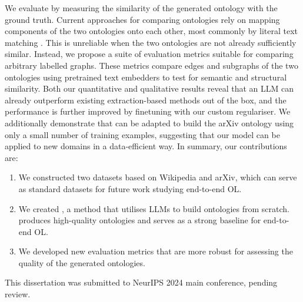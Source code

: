 We evaluate \name by measuring the similarity of the generated ontology with the ground truth. Current approaches for comparing ontologies rely on mapping components of the two ontologies onto each other, most commonly by literal text matching \cite{maedche2002measuring,Treeratpituk2013GraphbasedAT}. This is unreliable when the two ontologies are not already sufficiently similar. Instead, we propose a suite of evaluation metrics suitable for comparing arbitrary labelled graphs. These metrics compare edges and subgraphs of the two ontologies using pretrained text embedders to test for semantic and structural similarity. Both our quantitative and qualitative results reveal that an LLM can already outperform existing extraction-based methods out of the box, and the performance is further improved by finetuning with our custom regulariser. We additionally demonstrate that \name can be adapted to build the arXiv ontology using only a small number of training examples, suggesting that our model can be applied to new domains in a data-efficient way. In summary, our contributions are:
\begin{enumerate}
    \item We constructed two datasets based on Wikipedia and arXiv, which can serve as standard datasets for future work studying end-to-end OL.
    \item We created \name, a method that utilises LLMs to build ontologies from scratch. \name produces high-quality ontologies and serves as a strong baseline for end-to-end OL.
    \item We developed new evaluation metrics that are more robust for assessing the quality of the generated ontologies.
\end{enumerate}

This dissertation was submitted to NeurIPS 2024 main conference, pending review.